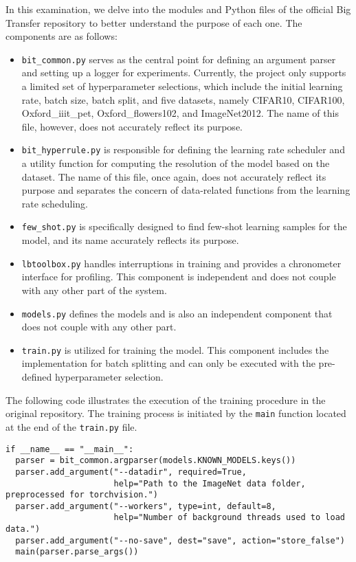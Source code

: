 \vspace{0.4em}
In this examination, we delve into the modules and Python files of the official Big Transfer repository to better understand the purpose of each one. The components are as follows:

\begin{itemize}
    \item \texttt{bit\_common.py} serves as the central point for defining an argument parser and setting up a logger for experiments. Currently, the project only supports a limited set of hyperparameter selections, which include the initial learning rate, batch size, batch split, and five datasets, namely CIFAR10, CIFAR100, Oxford\_iiit\_pet, Oxford\_flowers102, and ImageNet2012. The name of this file, however, does not accurately reflect its purpose.
    \item \texttt{bit\_hyperrule.py} is responsible for defining the learning rate scheduler and a utility function for computing the resolution of the model based on the dataset. The name of this file, once again, does not accurately reflect its purpose and separates the concern of data-related functions from the learning rate scheduling.
    \item \texttt{few\_shot.py} is specifically designed to find few-shot learning samples for the model, and its name accurately reflects its purpose.
    \item \texttt{lbtoolbox.py} handles interruptions in training and provides a chronometer interface for profiling. This component is independent and does not couple with any other part of the system.
    \item \texttt{models.py} defines the models and is also an independent component that does not couple with any other part.
    \item \texttt{train.py} is utilized for training the model. This component includes the implementation for batch splitting and can only be executed with the pre-defined hyperparameter selection.
\end{itemize}


The following code illustrates the execution of the training procedure in the original repository. The training process is initiated by the \texttt{main} function located at the end of the \texttt{train.py} file. 
\vspace{0.2em}

\begin{verbatim}
if __name__ == "__main__":
  parser = bit_common.argparser(models.KNOWN_MODELS.keys())
  parser.add_argument("--datadir", required=True,
                      help="Path to the ImageNet data folder, preprocessed for torchvision.")
  parser.add_argument("--workers", type=int, default=8,
                      help="Number of background threads used to load data.")
  parser.add_argument("--no-save", dest="save", action="store_false")
  main(parser.parse_args())
\end{verbatim}
\vspace{0.2em}


